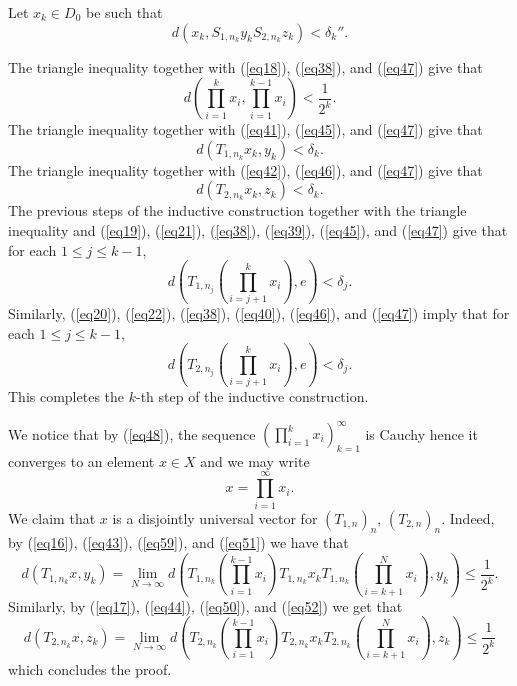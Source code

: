 \documentclass[12pt,a4paper]{amsart}
\theoremstyle{plain}
\theoremstyle{definition}
\theoremstyle{remark}
\theoremstyle{fact}
\begin{document}
    Let $x_k \in D_0$ be such that
    \begin{equation}\label{eq47}
        d(x_k,S_{1, n_k}y_kS_{2, n_k}z_k)<\delta_k''.
    \end{equation}

    The triangle inequality together with (\ref{eq18}), (\ref{eq38}), and (\ref{eq47}) give that
    \begin{equation}\label{eq48}
        d(\prod_{i=1}^{k}x_i,\prod_{i=1}^{k-1}x_i)<\frac{1}{2^k}.
    \end{equation}
    The triangle inequality together with (\ref{eq41}), (\ref{eq45}), and (\ref{eq47}) give that
    \begin{equation}\label{eq59}
        d(T_{1, n_k}x_k,y_k)<\delta_k.
    \end{equation}
    The triangle inequality together with (\ref{eq42}), (\ref{eq46}), and (\ref{eq47})  give that
    \begin{equation}\label{eq50}
        d(T_{2, n_k}x_k,z_k)<\delta_k.
    \end{equation}
    The previous steps of the inductive construction together with the triangle inequality and  (\ref{eq19}), (\ref{eq21}), (\ref{eq38}), (\ref{eq39}), (\ref{eq45}), and (\ref{eq47}) give that for each $1\leq j\leq k-1$,
    \begin{equation}\label{eq51}
    d(T_{1, n_j}(\prod_{i=j+1}^{k}x_i),e)<\delta_j.   
    \end{equation}
    Similarly, (\ref{eq20}), (\ref{eq22}), (\ref{eq38}), (\ref{eq40}), (\ref{eq46}), and (\ref{eq47}) imply that for each $1\leq j\leq k-1$,
    \begin{equation}\label{eq52}
       d(T_{2, n_j}(\prod_{i=j+1}^{k}x_i),e)<\delta_j.
    \end{equation}
    This completes the $k$-th step of the inductive construction.

    We notice that by (\ref{eq48}), the sequence $(\prod_{i=1}^{k}x_i)_{k=1}^{\infty}$ is Cauchy hence it converges to an element $x\in X$ and we may write
    \begin{equation*}
        x=\prod_{i=1}^{\infty}x_i.
    \end{equation*}
    We claim that $x$ is a disjointly universal vector for $(T_{1,n})_n$, $(T_{2,n})_n$. Indeed, by (\ref{eq16}), (\ref{eq43}), (\ref{eq59}), and (\ref{eq51}) we have that
    \begin{equation*}
        d(T_{1, n_k}x,y_k)=\lim_{N\rightarrow \infty}d(T_{1, n_k}(\prod_{i=1}^{k-1}x_i)T_{1, n_k}x_k T_{1, n_k}(\prod_{i=k+1}^Nx_i),y_k)\leq \frac{1}{2^k}. 
    \end{equation*}
    Similarly, by (\ref{eq17}), (\ref{eq44}), (\ref{eq50}), and (\ref{eq52}) we get that
    \begin{equation*}
        d(T_{2, n_k}x,z_k)=\lim_{N\rightarrow \infty}d(T_{2, n_k}(\prod_{i=1}^{k-1}x_i)T_{2, n_k}x_k T_{2, n_k}(\prod_{i=k+1}^Nx_i),z_k)\leq \frac{1}{2^k} 
    \end{equation*}
    which concludes the proof.
    
\end{document}
